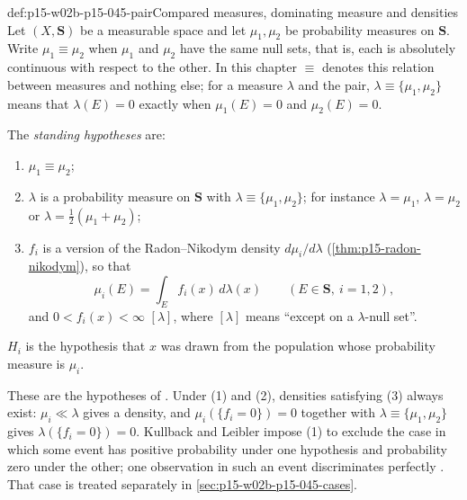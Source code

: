 \begin{hbdefinition}{def:p15-w02b-p15-045-pair}{Compared measures, dominating measure and densities}
Let \((X,\mathbf S)\) be a measurable space and let \(\mu_1,\mu_2\) be
probability measures on \(\mathbf S\). Write \(\mu_1\equiv\mu_2\) when
\(\mu_1\) and \(\mu_2\) have the same null sets, that is, each is
absolutely continuous with respect to the other. In this chapter
\(\equiv\) denotes this relation between measures and nothing else; for
a measure \(\lambda\) and the pair, \(\lambda\equiv\{\mu_1,\mu_2\}\)
means that \(\lambda(E)=0\) exactly when \(\mu_1(E)=0\) and
\(\mu_2(E)=0\).

The \emph{standing hypotheses} are:
\begin{enumerate}
\item \(\mu_1\equiv\mu_2\);
\item \(\lambda\) is a probability measure on \(\mathbf S\) with
\(\lambda\equiv\{\mu_1,\mu_2\}\); for instance \(\lambda=\mu_1\),
\(\lambda=\mu_2\) or \(\lambda=\tfrac12(\mu_1+\mu_2)\);
\item \(f_i\) is a version of the Radon--Nikodym density
\(d\mu_i/d\lambda\) (\cref{thm:p15-radon-nikodym}), so that
\[
  \mu_i(E)=\int_E f_i(x)\,d\lambda(x)\qquad(E\in\mathbf S,\ i=1,2),
\]
and \(0<f_i(x)<\infty\) \([\lambda]\), where \([\lambda]\) means
``except on a \(\lambda\)-null set''.
\end{enumerate}
\(H_i\) is the hypothesis that \(x\) was drawn from the population whose
probability measure is \(\mu_i\).
\end{hbdefinition}

These are the hypotheses of \cite[pp.~79--80, eq.~(2.1)]{KullbackLeibler1951Information}.
Under (1) and (2), densities satisfying (3) always exist: \(\mu_i\ll\lambda\)
gives a density, and \(\mu_i(\{f_i=0\})=0\) together with
\(\lambda\equiv\{\mu_1,\mu_2\}\) gives \(\lambda(\{f_i=0\})=0\).
Kullback and Leibler impose (1) to exclude the case in which some event
has positive probability under one hypothesis and probability zero
under the other; one observation in such an event discriminates
perfectly \cite[p.~79, n.~1]{KullbackLeibler1951Information}. That case
is treated separately in \cref{sec:p15-w02b-p15-045-cases}.

